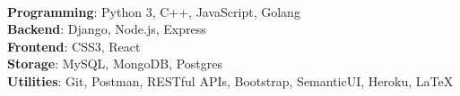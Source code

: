 \\
\textbf{Programming}: Python 3, C++, JavaScript, Golang \\
\vspace{1mm}
\textbf{Backend}: Django, Node.js, Express\\
\vspace{1mm}
\textbf{Frontend}: CSS3, React\\
\vspace{1mm}
\textbf{Storage}:  MySQL, MongoDB, Postgres\\
\vspace{1mm}
\textbf{Utilities}:  Git, Postman, RESTful APIs, Bootstrap, SemanticUI, Heroku, {\LaTeX}





  
  



